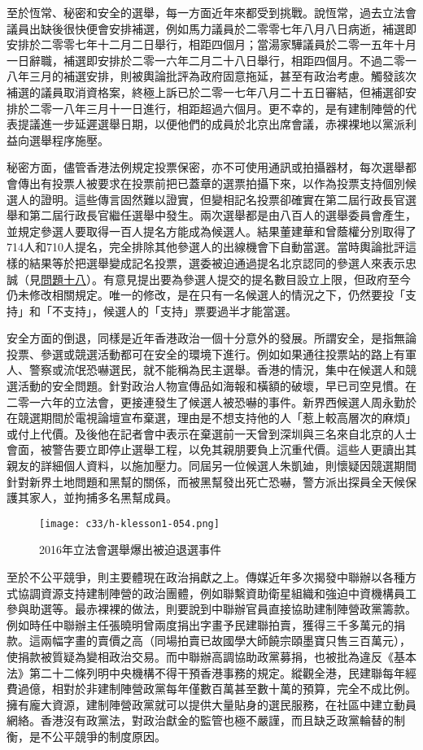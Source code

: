 至於恆常、秘密和安全的選舉，每一方面近年來都受到挑戰。說恆常，過去立法會議員出缺後很快便會安排補選，例如馬力議員於二零零七年八月八日病逝，補選即安排於二零零七年十二月二日舉行，相距四個月；當湯家驊議員於二零一五年十月一日辭職，補選即安排於二零一六年二月二十八日舉行，相距四個月。不過二零一八年三月的補選安排，則被輿論批評為政府固意拖延，甚至有政治考慮。觸發該次補選的議員取消資格案，終極上訴已於二零一七年八月二十五日審結，但補選卻安排於二零一八年三月十一日進行，相距超過六個月。更不幸的，是有建制陣營的代表提議進一步延遲選舉日期，以便他們的成員於北京出席會議，赤裸裸地以黨派利益向選舉程序施壓。

秘密方面，儘管香港法例規定投票保密，亦不可使用通訊或拍攝器材，每次選舉都會傳出有投票人被要求在投票前把已蓋章的選票拍攝下來，以作為投票支持個別候選人的證明。這些傳言固然難以證實，但變相記名投票卻確實在第二屆行政長官選舉和第二屆行政長官繼任選舉中發生。兩次選舉都是由八百人的選舉委員會產生，並規定參選人要取得一百人提名方能成為候選人。結果董建華和曾蔭權分別取得了714人和710人提名，完全排除其他參選人的出線機會下自動當選。當時輿論批評這樣的結果等於把選舉變成記名投票，選委被迫通過提名北京認同的參選人來表示忠誠（見\hyperref[sec:sec18]{問題十八}）。有意見提出要為參選人提交的提名數目設立上限，但政府至今仍未修改相關規定。唯一的修改，是在只有一名候選人的情況之下，仍然要投「支持」和「不支持」，候選人的「支持」票要過半才能當選。

安全方面的倒退，同樣是近年香港政治一個十分意外的發展。所謂安全，是指無論投票、參選或競選活動都可在安全的環境下進行。例如如果通往投票站的路上有軍人、警察或流氓恐嚇選民，就不能稱為民主選舉。香港的情況，集中在候選人和競選活動的安全問題。針對政治人物宣傳品如海報和橫額的破壞，早已司空見慣。在二零一六年的立法會，更接連發生了候選人被恐嚇的事件。新界西候選人周永勤於在競選期間於電視論壇宣布棄選，理由是不想支持他的人「惹上較高層次的麻煩」或付上代價。及後他在記者會中表示在棄選前一天曾到深圳與三名來自北京的人士會面，被警告要立即停止選舉工程，以免其親朋要負上沉重代價。這些人更讀出其親友的詳細個人資料，以施加壓力。同屆另一位候選人朱凱廸，則懷疑因競選期間針對新界土地問題和黑幫的關係，而被黑幫發出死亡恐嚇，警方派出探員全天候保護其家人，並拘捕多名黑幫成員。

\begin{figure}[htbp]
    \centering
    \texttt{[image: c33/h-klesson1-054.png]}
    \caption{2016年立法會選舉爆出被迫退選事件} 
\end{figure}

至於不公平競爭，則主要體現在政治捐獻之上。傳媒近年多次揭發中聯辦以各種方式協調資源支持建制陣營的政治團體，例如聯繫資助衛星組織和強迫中資機構員工參與助選等。最赤裸裸的做法，則要說到中聯辦官員直接協助建制陣營政黨籌款。例如時任中聯辦主任張曉明曾兩度捐出字畫予民建聯拍賣，獲得三千多萬元的捐款。這兩幅字畫的賣價之高（同場拍賣已故國學大師饒宗頤墨寶只售三百萬元），使捐款被質疑為變相政治交易。而中聯辦高調協助政黨募捐，也被批為違反《基本法》第二十二條列明中央機構不得干預香港事務的規定。縱觀全港，民建聯每年經費過億，相對於非建制陣營政黨每年僅數百萬甚至數十萬的預算，完全不成比例。擁有龐大資源，建制陣營政黨就可以提供大量貼身的選民服務，在社區中建立動員網絡。香港沒有政黨法，對政治獻金的監管也極不嚴謹，而且缺乏政黨輪替的制衡，是不公平競爭的制度原因。

